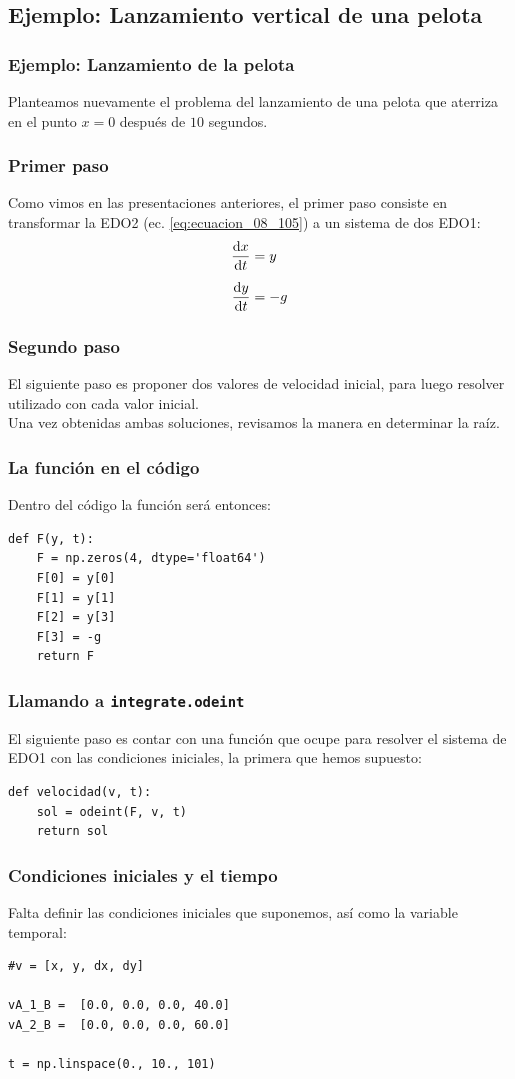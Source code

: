 \subsection*{Ejemplo: Lanzamiento vertical de una pelota}
\begin{frame}
\frametitle{Ejemplo: Lanzamiento de la pelota}
Planteamos nuevamente el problema del lanzamiento de una pelota que aterriza en el punto $x=0$ después de $10$ segundos.
\end{frame}
\begin{frame}
\frametitle{Primer paso}
Como vimos en las presentaciones anteriores, el primer paso consiste en transformar la EDO2 (ec. \ref{eq:ecuacion_08_105}) a un sistema de dos EDO1:
\begin{align}
\begin{aligned}
\dv{x}{t} &= y \\[0.5em]
\dv{y}{t} &= -g
\end{aligned}
\label{eq:ecuacion_08_106}
\end{align}
\end{frame}
\begin{frame}
\frametitle{Segundo paso}
El siguiente paso es proponer dos valores de velocidad inicial, para luego resolver utilizado  con cada valor inicial.
\\
\bigskip
\pause
Una vez obtenidas ambas soluciones, revisamos la manera en determinar la raíz.
\end{frame}
\begin{frame}[fragile]
\frametitle{La función en el código}
Dentro del código la función será entonces:
\begin{lstlisting}[caption=Código para el sistema de dos EDO1, style=codigopython]
def F(y, t):
    F = np.zeros(4, dtype='float64')
    F[0] = y[0]
    F[1] = y[1]
    F[2] = y[3]
    F[3] = -g
    return F
\end{lstlisting}
\end{frame}
\begin{frame}[fragile]
\frametitle{Llamando a \texttt{integrate.odeint}}
El siguiente paso es contar con una función que ocupe  para resolver el sistema de EDO1 con las condiciones iniciales, la primera que hemos supuesto:
\begin{lstlisting}[caption=Llamando a \texttt{odeint}, style=codigopython]
def velocidad(v, t):
    sol = odeint(F, v, t)
    return sol
\end{lstlisting}
\end{frame}
\begin{frame}[fragile]
\frametitle{Condiciones iniciales y el tiempo}
Falta definir las condiciones iniciales que suponemos, así como la variable temporal:
\begin{lstlisting}[caption=Estableciendo las condiciones iniciales, style=codigopython]
#v = [x, y, dx, dy]

vA_1_B =  [0.0, 0.0, 0.0, 40.0]
vA_2_B =  [0.0, 0.0, 0.0, 60.0]

t = np.linspace(0., 10., 101)
\end{lstlisting}
\end{frame}
